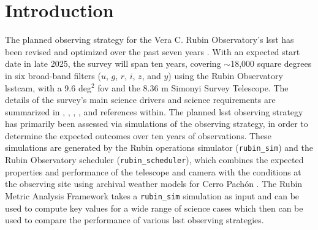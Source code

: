 \documentclass[preprintm,linenumbers]{aastex631}
\newcommand{\rubinsim}{\texttt{rubin\_sim}\xspace}
\newcommand{\rubinscheduler}{\texttt{rubin\_scheduler}\xspace}
\newcommand{\maf}{\texttt{MAF}\xspace}
\begin{document}
	\section{Introduction}
	\label{sec:introduction}

\glsresetall


	The planned observing strategy for the Vera C. Rubin Observatory's \gls*{lsst} has been revised and optimized over the past seven years \citep{SCOC_Report_1,2022ApJS..258....1B, SCOC_Report_2,SCOC_Report_3}. 
 With an expected start date in late 2025, the survey will span ten years, covering $\sim$18,000 square degrees in six broad-band filters ($u$, $g$, $r$, $i$, $z$, and $y$) using the Rubin Observatory \gls*{lsstcam}, with a 9.6 deg$^2$ \gls*{fov} and the 8.36 m Simonyi Survey Telescope. The details of the survey's main science drivers and science requirements are summarized in \cite{lsstScienceBook2009}, \cite{lsstSRD}, \cite{2019ApJ...873..111I}, \cite{2022ApJS..258....1B}, and references within. 
 The planned \gls*{lsst} observing strategy has primarily been assessed via simulations of the observing strategy, in order to determine the expected outcomes over ten years of observations.
 These simulations are generated by the Rubin operations simulator (\rubinsim) and the Rubin Observatory scheduler (\rubinscheduler), which combines the expected properties and performance of the telescope and camera with the conditions at the observing site using archival weather models for Cerro Pach\'on \citep{2014SPIE.9150E..14C, 2014SPIE.9150E..15D, 2017arXiv170804058L, 2019AJ....157..151N, jones_r_lynne_2020_4048838}.
 The Rubin Metric Analysis Framework \citep[\maf; ][]{2014SPIE.9149E..0BJ} takes a \rubinsim simulation as input and can be used to compute key values for a wide range of science cases which then can be used to compare the performance of various \gls*{lsst} observing strategies.
	
\end{document}
